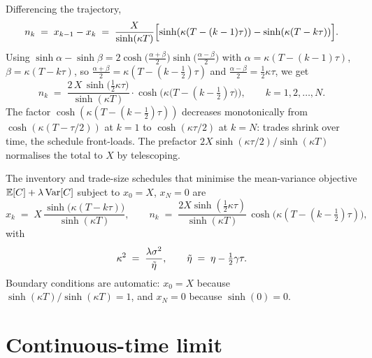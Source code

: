 Differencing the trajectory,
\begin{equation*}
  n_k \;=\; x_{k-1} - x_k
       \;=\; \frac{X}{\sinh(\kappa T)}\Bigl[\sinh(\kappa(T - (k-1)\tau))
                             - \sinh(\kappa(T - k\tau))\Bigr].
\end{equation*}
Using $\sinh\alpha - \sinh\beta = 2\cosh\!\bigl(\tfrac{\alpha+\beta}{2}\bigr)
\sinh\!\bigl(\tfrac{\alpha-\beta}{2}\bigr)$ with
$\alpha = \kappa(T - (k-1)\tau)$, $\beta = \kappa(T - k\tau)$, so
$\tfrac{\alpha+\beta}{2} = \kappa(T - (k-\tfrac{1}{2})\tau)$ and
$\tfrac{\alpha-\beta}{2} = \tfrac{1}{2}\kappa\tau$, we get
\begin{equation}
  \boxed{\;
  n_k \;=\; \frac{2\,X\,\sinh\!\bigl(\tfrac{1}{2}\kappa\tau\bigr)}{\sinh(\kappa T)}
       \cdot \cosh\!\bigl(\kappa\bigl(T - (k-\tfrac{1}{2})\tau\bigr)\bigr),
  \qquad k = 1, 2, \ldots, N.
  \;}
  \label{eq:ac_nstar}
\end{equation}
The factor $\cosh(\kappa(T - (k-\tfrac{1}{2})\tau))$ decreases
monotonically from $\cosh(\kappa(T-\tau/2))$ at $k=1$ to
$\cosh(\kappa\tau/2)$ at $k=N$: trades shrink over time, the
schedule front-loads. The prefactor $2X\sinh(\kappa\tau/2)/
\sinh(\kappa T)$ normalises the total to $X$ by telescoping.

\begin{keyfactbox}
The inventory and trade-size schedules that minimise the
mean-variance objective $\mathbb{E}[C] + \lambda\operatorname{Var}[C]$ subject to
$x_0 = X$, $x_N = 0$ are
\[
  x_k \;=\; X\,\frac{\sinh\!\bigl(\kappa(T - k\tau)\bigr)}{\sinh(\kappa T)},
  \qquad
  n_k \;=\; \frac{2X\sinh(\tfrac{1}{2}\kappa\tau)}{\sinh(\kappa T)}\,\cosh\!\bigl(\kappa(T - (k-\tfrac{1}{2})\tau)\bigr),
\]
with
\[
  \kappa^2 \;=\; \frac{\lambda\sigma^2}{\tilde\eta},
  \qquad
  \tilde\eta \;=\; \eta - \tfrac{1}{2}\gamma\tau.
\]
Boundary conditions are automatic: $x_0 = X$ because
$\sinh(\kappa T)/\sinh(\kappa T) = 1$, and $x_N = 0$ because
$\sinh(0) = 0$.
\end{keyfactbox}

\section{Continuous-time limit}
\label{sec:ac_ct_limit}


